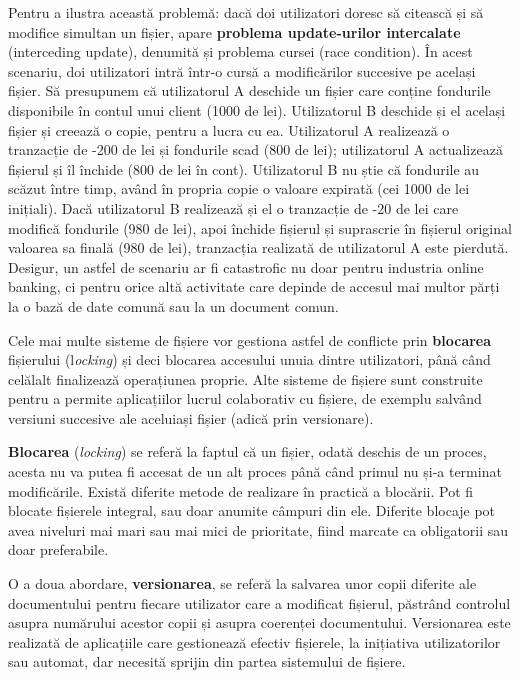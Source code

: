 Pentru a ilustra această problemă:  dacă doi utilizatori doresc să citească și
să modifice simultan un fișier, apare \textbf{problema update-urilor
intercalate} (interceding update), denumită și problema cursei (race condition).
În acest scenariu, doi utilizatori intră într-o cursă a modificărilor succesive
pe același fișier. Să presupunem că utilizatorul A deschide un fișier care
conține fondurile disponibile în contul unui client (1000 de lei). Utilizatorul
B deschide și el același fișier și creează o copie, pentru a lucra cu ea.
Utilizatorul A realizează o tranzacție de -200 de lei și fondurile scad (800 de
lei); utilizatorul A actualizează fișierul și îl închide (800 de lei în cont).
Utilizatorul B nu știe că fondurile au scăzut între timp, având în propria copie
o valoare expirată (cei 1000 de lei inițiali). Dacă utilizatorul B realizează și
el o tranzacție de -20 de lei care modifică fondurile (980 de lei), apoi închide
fișierul și suprascrie în fișierul original valoarea sa finală (980 de lei),
tranzacția realizată de utilizatorul A este pierdută.  Desigur, un astfel de
scenariu ar fi catastrofic nu doar pentru industria online banking, ci pentru
orice altă activitate care depinde de accesul mai multor părți la o bază de date
comună sau la un document comun.

Cele mai multe sisteme de fișiere vor gestiona astfel de conflicte prin
\textbf{blocarea} fișierului (l\textit{ocking}) și deci blocarea accesului unuia
dintre utilizatori, până când celălalt finalizează operațiunea proprie. Alte
sisteme de fișiere sunt construite pentru a permite aplicațiilor lucrul
colaborativ cu fișiere, de exemplu salvând versiuni succesive ale aceluiași
fișier (adică prin versionare).

\textbf{Blocarea} (\textit{locking}) se referă la faptul că un fișier, odată
deschis de un proces, acesta nu va putea fi accesat de un alt proces până când
primul nu și-a terminat modificările.  Există diferite metode de realizare în
practică a blocării. Pot fi blocate fișierele integral, sau doar anumite câmpuri
din ele. Diferite blocaje pot avea niveluri mai mari sau mai mici de prioritate,
fiind marcate ca obligatorii sau doar preferabile.

O a doua abordare, \textbf{versionarea}, se referă la salvarea unor copii
diferite ale documentului pentru fiecare utilizator care a modificat fișierul,
păstrând controlul asupra numărului acestor copii și asupra coerenței
documentului. Versionarea este realizată de aplicațiile care gestionează efectiv
fișierele, la inițiativa utilizatorilor sau automat, dar necesită sprijin din
partea sistemului de fișiere.

